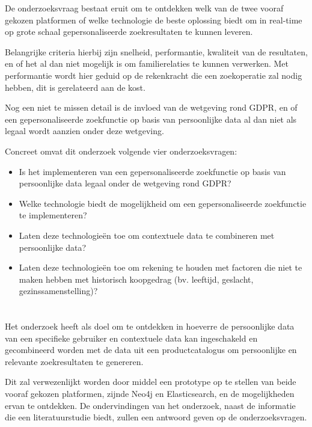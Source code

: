 De onderzoeksvraag bestaat eruit om te ontdekken welk van de twee vooraf gekozen platformen of welke technologie de beste oplossing biedt om in real-time op grote schaal gepersonaliseerde zoekresultaten te kunnen leveren.

Belangrijke criteria hierbij zijn snelheid, performantie, kwaliteit van de resultaten, en of het al dan niet mogelijk is om familierelaties te kunnen verwerken. Met performantie wordt hier geduid op de rekenkracht die een zoekoperatie zal nodig hebben, dit is gerelateerd aan de kost. 

Nog een niet te missen detail is de invloed van de wetgeving rond GDPR, en of een gepersonaliseerde zoekfunctie op basis van persoonlijke data al dan niet als legaal wordt aanzien onder deze wetgeving.

Concreet omvat dit onderzoek volgende vier onderzoeksvragen:
\begin{itemize}
	\item Is het implementeren van een gepersonaliseerde zoekfunctie op basis van persoonlijke data legaal onder de wetgeving rond GDPR?
	\item Welke technologie biedt de mogelijkheid om een gepersonaliseerde zoekfunctie te implementeren?
	\item Laten deze technologieën toe om contextuele data te combineren met persoonlijke data?
	\item Laten deze technologieën toe om rekening te houden met factoren die niet te maken hebben met historisch koopgedrag (bv. leeftijd, geslacht, gezinssamenstelling)?
\end{itemize} 

\section{}
\label{sec:onderzoeksdoelstelling}

Het onderzoek heeft als doel om te ontdekken in hoeverre de persoonlijke data van een specifieke gebruiker en contextuele data kan ingeschakeld en gecombineerd worden met de data uit een productcatalogus om persoonlijke en relevante zoekresultaten te genereren.

Dit zal verwezenlijkt worden door middel een prototype op te stellen van beide vooraf gekozen platformen, zijnde Neo4j en Elasticsearch, en de mogelijkheden ervan te ontdekken. De ondervindingen van het onderzoek, naast de informatie die een literatuurstudie biedt, zullen een antwoord geven op de onderzoeksvragen.

